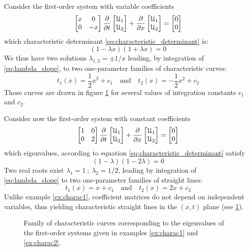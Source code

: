 \begin{example}
  \label{ex:charac1}
  Consider the first-order system with variable coefficients
\begin{equation*}
 \left[\begin{matrix}x &0 \\0 &-x\end{matrix}\right] \frac{\partial }{\partial t} \left[\begin{matrix}\mathcal{U}_1 \\ \mathcal{U}_2\end{matrix}\right] + \frac{\partial }{\partial x}\left[\begin{matrix}\mathcal{U}_1 \\ \mathcal{U}_2\end{matrix}\right] = \left[\begin{matrix}0 \\0\end{matrix}\right]
\end{equation*}
which characteristic determinant \eqref{eq:characteristic_determinant} is:
\begin{equation*}
  (1-\lambda x)(1+\lambda x)=0
\end{equation*}
We thus have two solutions $\lambda_{1,2}=\pm 1/x$ leading, by integration of \eqref{eq:lambda_slope}, to two one-parameter families of characteristic curves:
\begin{equation*}
  t_1(x)=\frac{1}{2}x^2+c_1  \quad \text{and} \quad t_2(x)=-\frac{1}{2}x^2+c_2 
\end{equation*}
Those curves are drawn in figure \ref{fig:exampleCharac} for several values of integration constants $c_1$ and $c_2$.
\end{example}
\begin{example}
  \label{ex:charac2}
  Consider now the first-order system with constant coefficients
\begin{equation*}
 \left[\begin{matrix}1 &0 \\0 &2\end{matrix}\right] \frac{\partial }{\partial t} \left[\begin{matrix}\mathcal{U}_1 \\ \mathcal{U}_2\end{matrix}\right] + \frac{\partial }{\partial x}\left[\begin{matrix}\mathcal{U}_1 \\ \mathcal{U}_2\end{matrix}\right] = \left[\begin{matrix}0 \\0\end{matrix}\right]
\end{equation*}
which eigenvalues, according to equation \eqref{eq:characteristic_determinant} satisfy
\begin{equation*}
  (1 - \lambda )(1- 2\lambda)=0
\end{equation*}
Two real roots exist $\lambda_1=1 \: ; \: \lambda_2=1/2$, leading by integration of \eqref{eq:lambda_slope} to two one-parameter families of straight lines:
\begin{equation*}
  t_1(x)=x+c_1  \quad \text{and} \quad t_2(x)=2x+c_2 
\end{equation*}
Unlike example \ref{ex:charac1}, coefficient matrices do not depend on independent variables, thus yielding characteristic straight lines in the $(x,t)$ plane (see \ref{fig:exampleCharac}).
\end{example}
\begin{figure}[h]
  \centering
  \caption{Family of characteristic curves corresponding to the eigenvalues of the first-order systems given in examples \ref{ex:charac1} and \ref{ex:charac2}.}
  \label{fig:exampleCharac}
\end{figure}


